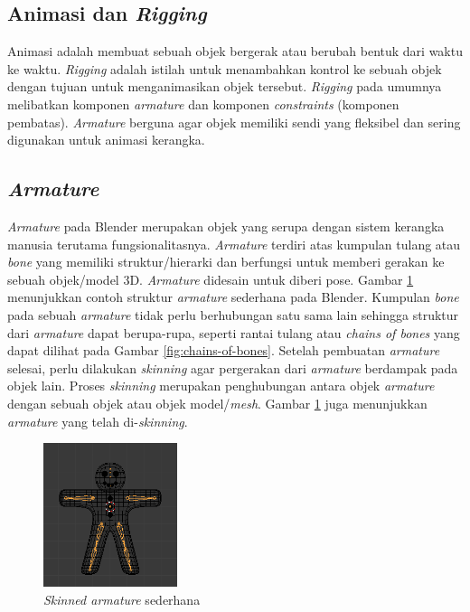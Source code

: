 \subsection{Animasi dan \textit{Rigging}}

Animasi adalah membuat sebuah objek bergerak atau berubah bentuk dari waktu ke
waktu. \textit{Rigging} adalah istilah untuk menambahkan kontrol ke sebuah objek
dengan tujuan untuk menganimasikan objek tersebut. \textit{Rigging} pada umumnya
melibatkan komponen \textit{armature} dan komponen \textit{constraints}
(komponen pembatas). \textit{Armature} berguna agar objek memiliki sendi yang
fleksibel dan sering digunakan untuk animasi kerangka.

\subsection{\textit{Armature}}

\textit{Armature} pada Blender merupakan objek yang serupa dengan sistem
kerangka manusia terutama fungsionalitasnya. \textit{Armature} terdiri atas
kumpulan tulang atau \textit{bone} yang memiliki struktur/hierarki dan berfungsi
untuk memberi gerakan ke sebuah objek/model 3D. \textit{Armature} didesain untuk
diberi pose. Gambar \ref{fig:basic-armature} menunjukkan contoh struktur
\textit{armature} sederhana pada Blender. Kumpulan \textit{bone} pada sebuah
\textit{armature} tidak perlu berhubungan satu sama lain sehingga struktur dari
\textit{armature} dapat berupa-rupa, seperti rantai tulang atau \textit{chains
of bones} yang dapat dilihat pada Gambar \ref{fig:chains-of-bones}. Setelah
pembuatan \textit{armature} selesai, perlu dilakukan \textit{skinning} agar
pergerakan dari \textit{armature} berdampak pada objek lain. Proses
\textit{skinning} merupakan penghubungan antara objek \textit{armature} dengan
sebuah objek atau objek model/\textit{mesh}. Gambar \ref{fig:basic-armature}
juga menunjukkan \textit{armature} yang telah di-\textit{skinning}.

\begin{figure}[ht]
    \centering
    \includegraphics[width=0.35\textwidth]{resources/chapter-2-basic-armature.png}
    \caption{\textit{Skinned armature} sederhana \parencite{blender-manual}}
    \label{fig:basic-armature}
\end{figure}


